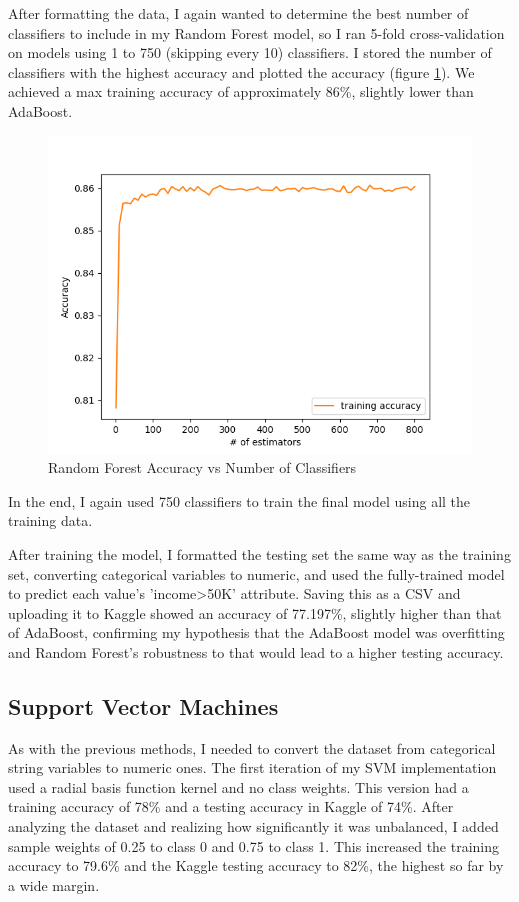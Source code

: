 \documentclass{article}
\begin{document}
After formatting the data, I again wanted to determine the best number of classifiers to include in my Random Forest model, so I ran 5-fold cross-validation on models using 1 to 750 (skipping every 10) classifiers. I stored the number of classifiers with the highest accuracy and plotted the accuracy (figure \ref{fig:rf}). We achieved a max training accuracy of approximately 86\%, slightly lower than AdaBoost. 

\begin{figure}[h]
    \centering
    \includegraphics[width=0.4\linewidth]{img/rf_acc.png}
    \caption{Random Forest Accuracy vs Number of Classifiers}
    \label{fig:rf}
\end{figure}

In the end, I again used 750 classifiers to train the final model using all the training data.

After training the model, I formatted the testing set the same way as the training set, converting categorical variables to numeric, and used the fully-trained model to predict each value's 'income>50K' attribute. Saving this as a CSV and uploading it to Kaggle showed an accuracy of 77.197\%, slightly higher than that of AdaBoost, confirming my hypothesis that the AdaBoost model was overfitting and Random Forest's robustness to that would lead to a higher testing accuracy.

\subsection{Support Vector Machines}

As with the previous methods, I needed to convert the dataset from categorical string variables to numeric ones. The first iteration of my SVM implementation used a radial basis function kernel and no class weights. This version had a training accuracy of 78\% and a testing accuracy in Kaggle of 74\%. After analyzing the dataset and realizing how significantly it was unbalanced, I added sample weights of 0.25 to class 0 and 0.75 to class 1. This increased the training accuracy to 79.6\% and the Kaggle testing accuracy to 82\%, the highest so far by a wide margin. 
\end{document}
